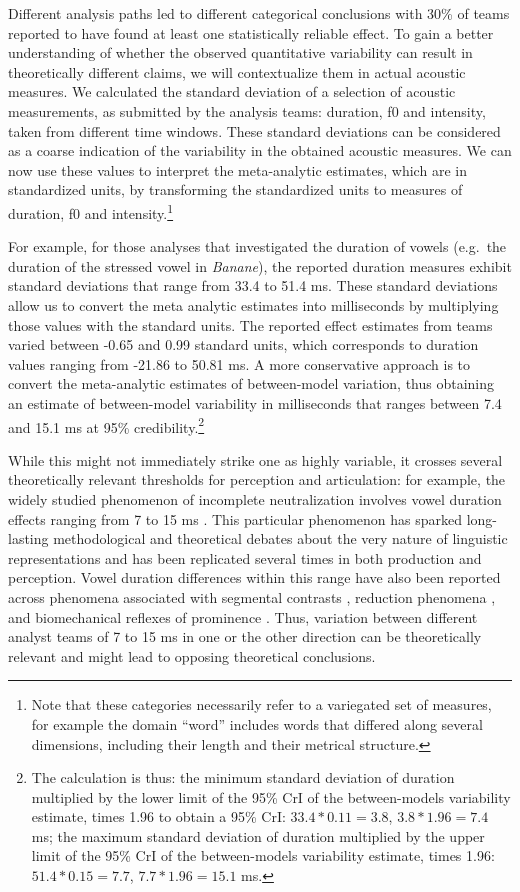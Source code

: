 \documentclass[Review,times,sageh]{sagej}
\begin{document}
Different analysis paths led to different categorical conclusions with 30\% of teams reported to have found at least one statistically reliable effect.
To gain a better understanding of whether the observed quantitative variability can result in theoretically different claims, we will contextualize them in actual acoustic measures.
We calculated the standard deviation of a selection of acoustic measurements, as submitted by the analysis teams: duration, f0 and intensity, taken from different time windows.
These standard deviations can be considered as a coarse indication of the variability in the obtained acoustic measures.
We can now use these values to interpret the meta-analytic estimates, which are in standardized units, by transforming the standardized units to measures of duration, f0 and intensity.\footnote{Note that these categories necessarily refer to a variegated set of measures, for example the domain ``word'' includes words that differed along several dimensions, including their length and their metrical structure.}

For example, for those analyses that investigated the duration of vowels (e.g.~the duration of the stressed vowel in \emph{Banane}), the reported duration measures exhibit standard deviations that range from 33.4 to 51.4 ms.
These standard deviations allow us to convert the meta analytic estimates into milliseconds by multiplying those values with the standard units.
The reported effect estimates from teams varied between -0.65 and 0.99 standard units, which corresponds to duration values ranging from -21.86 to 50.81 ms.
A more conservative approach is to convert the meta-analytic estimates of between-model variation, thus obtaining an estimate of between-model variability in milliseconds that ranges between 7.4 and 15.1 ms at 95\% credibility.\footnote{The calculation is thus: the minimum standard deviation of duration multiplied by the lower limit of the 95\% CrI of the between-models variability estimate, times 1.96 to obtain a 95\% CrI: \(33.4 * 0.11 = 3.8\), \(3.8 * 1.96 = 7.4\) ms; the maximum standard deviation of duration multiplied by the upper limit of the 95\% CrI of the between-models variability estimate, times 1.96: \(51.4 * 0.15 = 7.7\), \(7.7 * 1.96 = 15.1\) ms.}

While this might not immediately strike one as highly variable, it crosses several theoretically relevant thresholds for perception and articulation:
for example, the widely studied phenomenon of incomplete neutralization involves vowel duration effects ranging from 7 to 15 ms \citep{nicenboim2018using}.
This particular phenomenon has sparked long-lasting methodological and theoretical debates about the very nature of linguistic representations \citep{port2005against} and has been replicated several times in both production and perception.
Vowel duration differences within this range have also been reported across phenomena associated with segmental contrasts \citep{coretta2019}, reduction phenomena \citep{nowak2006}, and biomechanical reflexes of prominence \citep{mucke2014effect}.
Thus, variation between different analyst teams of 7 to 15 ms in one or the other direction can be theoretically relevant and might lead to opposing theoretical conclusions.
\end{document}

